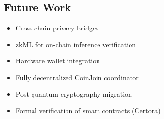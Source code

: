 \documentclass[11pt]{article}
\theoremstyle{definition}
\theoremstyle{plain}
\theoremstyle{remark}
\begin{document}
\subsection{Future Work}

\begin{itemize}
    \item Cross-chain privacy bridges
    \item zkML for on-chain inference verification
    \item Hardware wallet integration
    \item Fully decentralized CoinJoin coordinator
    \item Post-quantum cryptography migration
    \item Formal verification of smart contracts (Certora)
\end{itemize}
\end{document}
